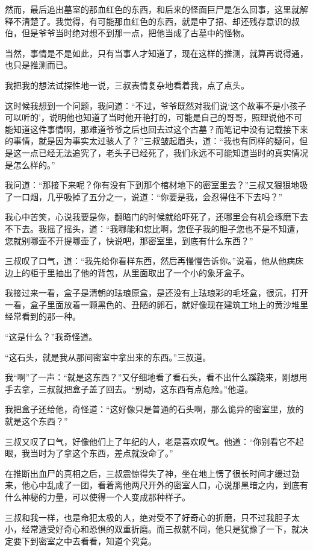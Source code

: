然而，最后追出墓室的那血红色的东西，和后来的怪面巨尸是怎么回事，这里就解释不清楚了。我觉得，有可能那血红色的东西，就是中了招、却还残存意识的叔伯，但是爷爷当时绝对想不到那一点，把他当成了古墓中的怪物。

当然，事情是不是如此，只有当事人才知道了，现在这样的推测，就算再说得通，也只是推测而已。

我把我的想法试探性地一说，三叔表情复杂地看着我，点了点头。

这时候我想到一个问题，我问道：“不过，爷爷既然对我们说‘这个故事不是小孩子可以听的’，说明他也知道了当时他开艳打的，可能是自己的哥哥，照理说他不可能知道这件事情啊，那难道爷爷之后也回去过这个古墓？而笔记中没有记载接下来的事情，就是因为事实太过骇人了？”三叔皱起眉头，道：“我也有同样的疑问，但是这一点已经无法追究了，老头子已经死了，我们永远不可能知道当时的真实情况是怎么样的。”

我问道：“那接下来呢？你有没有下到那个棺材地下的密室里去？”三叔又狠狠地吸了一口烟，几乎吸掉了五分之一，说道：“你要是我，会忍得住不下去吗？”

我心中苦笑，心说我要是你，翻暗门的时候就给吓死了，还哪里会有机会琢磨下去不下去。我摇了摇头，道：“我哪能和您比啊，您侄子我的胆子您也不是不知遭，您就别哪壶不开提哪壶了，快说吧，那密室里，到底有什么东西？”

三叔叹了口气，道：“我先给你看样东西，然后再慢慢告诉你。”说着，他从他病床边上的柜于里抽出了他的背包，从里面取出了一个小的象牙盒子。

我接过来一看，盒子是清朝的珐琅原盒，是还没有上珐琅彩的毛坯盒，很沉，打开一看，盒子里面放着一颗黑色的、丑陋的卵石，就好像现在建筑工地上的黄沙堆里经常看到的那一种。

“这是什么？”我奇怪道。

“这石头，就是我从那间密室中拿出来的东西。”三叔道。

我“啊”了一声：“就是这东西？”又仔细地看了看石头，看不出什么蹊跷来，刚想用手去拿，三叔就把盒子盖了回去。“别动，这东西有点危险。”他道。

我把盒子还给他，奇怪道：“这好像只是普通的石头啊，那么诡异的密室里，放的就是这个东西？”

三叔又叹了口气，好像他们上了年纪的人，老是喜欢叹气。他道：“你别看它不起眼，我当时为了拿这个东西，差点就没命了。”

在推断出血尸的真相之后，三叔震惊得失了神，坐在地上愣了很长时间才缓过劲来，他心中乱成了一团，看着离他两尺开外的密室人口，心说那黑暗之内，到底有什么神秘的力量，可以使得一个人变成那种样子。

三叔和我一样，也是命犯太极的人，绝对受不了好奇心的折磨，只不过我胆子太小，经常遭受好奇心和恐惧的双重折磨。而三叔就不同，他只是犹豫了一下，就决定要下到密室之中去看看，知道个究竟。

